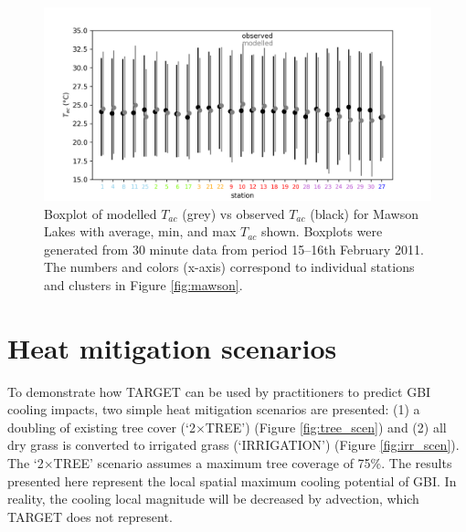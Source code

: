 \documentclass[journal abbreviation, manuscript]{copernicus}
\begin{document}
\begin{figure}[!htbp]

\includegraphics[width=1.0\textwidth,keepaspectratio]{figure8.png}

 \caption{Boxplot of modelled $T_{ac}$ (grey) vs observed $T_{ac}$ (black) for Mawson Lakes with average, min, and max $T_{ac}$ shown. Boxplots were generated from 30 minute data from period 15--16th February 2011.  The  numbers and colors (x-axis) correspond to individual stations and clusters in Figure \ref{fig:mawson}.} \label{fig:MawsonBox}


\end{figure}

\section{Heat mitigation scenarios}

To demonstrate how TARGET can be used by practitioners  to predict GBI cooling impacts, two simple heat mitigation scenarios are presented: (1) a doubling of existing tree cover (`2$\times$TREE') (Figure \ref{fig:tree_scen}) and (2) all dry grass is converted to irrigated grass (`IRRIGATION') (Figure \ref{fig:irr_scen}). The `2$\times$TREE' scenario assumes a maximum tree coverage of 75\%.   The results presented here represent the local spatial maximum cooling potential of GBI. In reality, the cooling local magnitude will be decreased by advection, which TARGET does not represent. 
\end{document}
